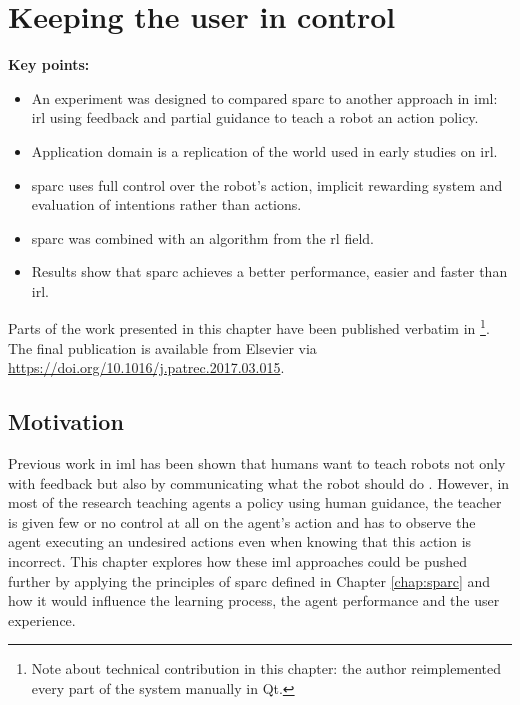 \chapter{Keeping the user in control}\label{chap:control}

\graphicspath{{images/control/}}

\begin{framed}
	\textbf{Key points:}
	
	\begin{itemize}
		\item An experiment was designed to compared \gls{sparc} to another approach in \gls{iml}: \acrfull{irl} using feedback and partial guidance to teach a robot an action policy.
		\item Application domain is a replication of the world used in early studies on \acrshort{irl}.
		\item \gls{sparc} uses full control over the robot's action, implicit rewarding system and evaluation of intentions rather than actions.
		\item \gls{sparc} was combined with an algorithm from the \acrlong{rl} field.
		\item Results show that \gls{sparc} achieves a better performance, easier and faster than \acrshort{irl}.
	\end{itemize}
\end{framed}

Parts of the work presented in this chapter have been published verbatim in \cite{senft2017supervised} \footnote{Note about technical contribution in this chapter: the author reimplemented every part of the system manually in Qt.}. The final publication is available from Elsevier via \url{https://doi.org/10.1016/j.patrec.2017.03.015}.

\newpage
\section{Motivation}

Previous work in \gls{iml} has been shown that humans want to teach robots not only with feedback but also by communicating what the robot should do \citep{thomaz2008teachable}. However, in most of the research teaching agents a policy using human guidance, the teacher is given few or no control at all on the agent's action and has to observe the agent executing an undesired actions even when knowing that this action is incorrect. This chapter explores how these \gls{iml} approaches could be pushed further by applying the principles of \gls{sparc} defined in Chapter \ref{chap:sparc} and how it would influence the learning process, the agent performance and the user experience.

